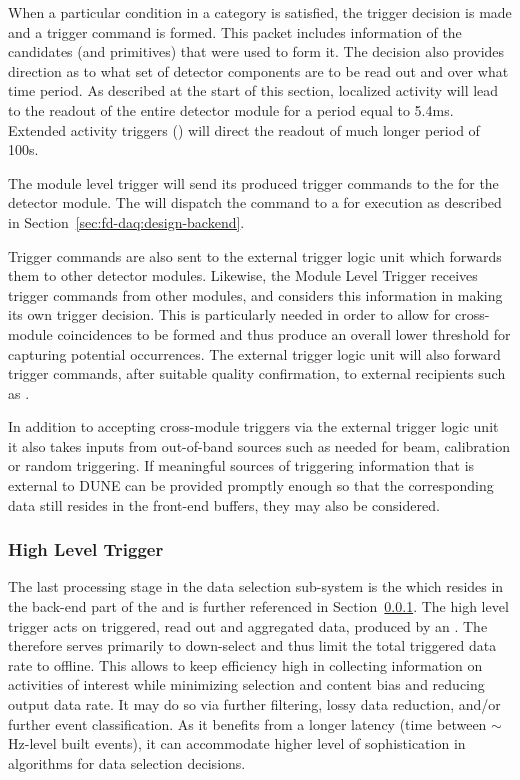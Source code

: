 When a particular condition in a category is satisfied, the trigger
decision is made and a trigger command is formed. 
This packet includes information of the candidates (and primitives)
that were used to form it. 
The decision also provides direction as to what set of detector components
are to be read out and over what time period.
As described at the start of this section, localized activity will lead
to the readout of the entire detector module for a period equal to 5.4ms.  Extended activity triggers () will
direct the readout of much longer period of 100s.

The module level trigger will send its produced trigger commands to the
 for the detector module.  The
 will dispatch the command to a  for
execution as described in Section~\ref{sec:fd-daq:design-backend}.

Trigger commands are also sent to the external trigger logic unit which
forwards them to other detector modules. Likewise, the Module Level
Trigger receives trigger commands from other modules, and considers
this information in making its own trigger decision.
This is particularly needed in order to allow for cross-module
coincidences to be formed and thus produce an overall lower threshold for
capturing potential  occurrences. 
The external trigger logic unit will also forward  trigger
commands, after suitable quality confirmation, to external recipients
such as .

In addition to accepting cross-module triggers via the external trigger
logic unit it also takes inputs from out-of-band sources such as
needed for beam, calibration or random triggering. 
If meaningful sources of triggering information that is external to
DUNE can be provided promptly enough so that the corresponding data
still resides in the front-end buffers, they may also be considered.


\subsubsection{High Level Trigger}
\label{sec:fd-daq:design-data-reduction}

The last processing stage in the data selection sub-system is the
 which resides in the back-end part of the  and
is further referenced in Section~\ref{sec:fd-daq:design-data-reduction}.
The high level trigger acts on triggered, read out and aggregated data,
produced by an . 
The  therefore serves primarily to down-select and thus
limit the total triggered data rate to offline. This allows to keep
efficiency high in collecting information on activities of interest
while minimizing selection and content bias and reducing output data
rate. It may do so via 
further filtering, lossy data reduction, and/or further event
classification. As it benefits from a longer latency (time between
$\sim$Hz-level built events), it can accommodate higher level of
sophistication in algorithms for data selection decisions.

